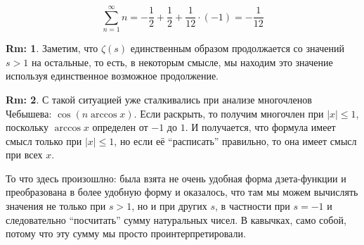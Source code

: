\documentclass[12pt]{article}
\theoremstyle{definition}
\newtheorem{rem}{Rm:}
\newcommand{\ddsum}[2]{\displaystyle\sum\limits_{#1}^{#2}}
\begin{document}
$$
	\ddsum{n = 1}{\infty}n = -\dfrac{1}{2} + \dfrac{1}{2} + \dfrac{1}{12}{\cdot}(-1) = -\dfrac{1}{12} 
$$
\begin{rem}
	Заметим, что $\zeta(s)$ единственным образом продолжается со значений $s > 1$ на остальные, то есть, в некоторым смысле, мы находим это значение используя единственное возможное продолжение.
\end{rem}
\begin{rem}
	С такой ситуацией уже сталкивались при анализе многочленов Чебышева: $\cos{(n \arccos{x})}$. Если раскрыть, то получим многочлен при $|x| \leq 1$, поскольку $\arccos{x}$ определен от $-1$ до $1$. И получается, что формула имеет смысл только при $|x| \leq 1$, но если её ``расписать'' правильно, то она имеет смысл при всех $x$.
\end{rem}
То что здесь произошлно: была взята не очень удобная форма дзета-функции и преобразована в более удобную форму и оказалось, что там мы можем вычислять значения не только при $s > 1$, но и при других $s$, в частности при $s = -1$ и следовательно ``посчитать'' сумму натуральных чисел. В кавычках, само собой, потому что эту сумму мы просто проинтерпретировали.
\end{document}
